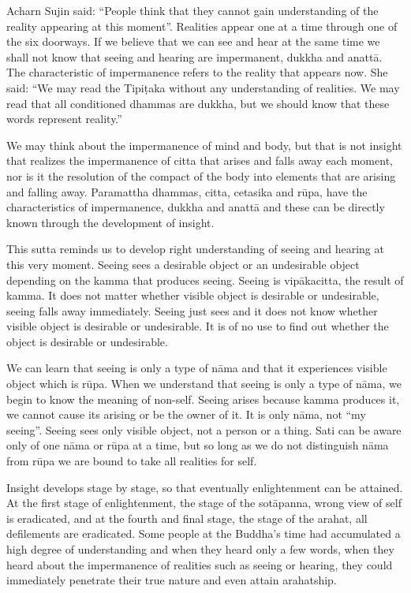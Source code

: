Acharn Sujin said: ``People think that they cannot gain understanding of the reality appearing at this moment''. Realities appear one at a time through one of the six doorways. If we believe that we can see and hear at the same time we shall not know that seeing and hearing are impermanent, dukkha and anattā. The characteristic of impermanence refers to the reality that appears now. She said: ``We may read the Tipiṭaka without any understanding of realities. We may read that all conditioned dhammas are dukkha, but we should know that these words represent reality.''

We may think about the impermanence of mind and body, but that is not insight that realizes the impermanence of citta that arises and falls away each moment, nor is it the resolution of the compact of the body into elements that are arising and falling away. Paramattha dhammas, citta, cetasika and rūpa, have the characteristics of impermanence, dukkha and anattā and these can be directly known through the development of insight.

This sutta reminds us to develop right understanding of seeing and hearing at this very moment. Seeing sees a desirable object or an undesirable object depending on the kamma that produces seeing. Seeing is vipākacitta, the result of kamma. It does not matter whether visible object is desirable or undesirable, seeing falls away immediately. Seeing just sees and it does not know whether visible object is desirable or undesirable. It is of no use to find out whether the object is desirable or undesirable.

We can learn that seeing is only a type of nāma and that it experiences visible object which is rūpa. When we understand that seeing is only a type of nāma, we begin to know the meaning of non-self. Seeing arises because kamma produces it, we cannot cause its arising or be the owner of it. It is only nāma, not ``my seeing''. Seeing sees only visible object, not a person or a thing. Sati can be aware only of one nāma or rūpa at a time, but so long as we do not distinguish nāma from rūpa we are bound to take all realities for self.

Insight develops stage by stage, so that eventually enlightenment can be attained. At the first stage of enlightenment, the stage of the sotāpanna, wrong view of self is eradicated, and at the fourth and final stage, the stage of the arahat, all defilements are eradicated. Some people at the Buddha’s time had accumulated a high degree of understanding and when they heard only a few words, when they heard about the impermanence of realities such as seeing or hearing, they could immediately penetrate their true nature and even attain arahatship.

